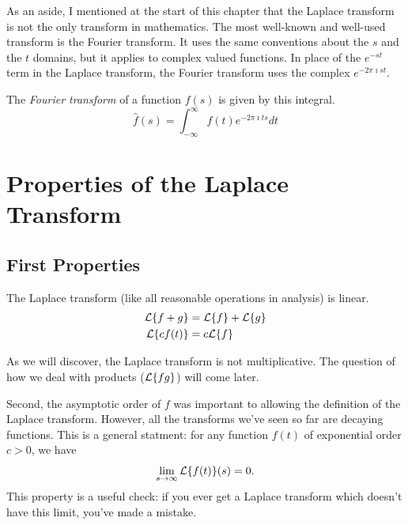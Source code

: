 \documentclass[fleqn,letterpaper]{report}
\begin{document}
As an aside, I mentioned at the start of this chapter that the
Laplace transform is not the only transform in mathematics.
The most well-known and well-used transform is the 
Fourier transform. It uses the same conventions about the $s$
and the $t$ domains, but it applies to complex valued
functions. In place of the $e^{-st}$ term in the Laplace
transform, the Fourier transform uses the complex $e^{-2\pi
\imath st}$. 

\begin{defn}
The \emph{Fourier transform} of a function $f(s)$ is given by
this integral.
\begin{equation*}
\hat{f}(s) = \int_{-\infty}^\infty f(t) e^{-2\pi \imath t s} dt 
\end{equation*}
\end{defn}

\section{Properties of the Laplace Transform}
\label{laplace-transforms-properties}

\subsection{First Properties}
\label{first-properties}

\begin{prop}
The Laplace transform (like all reasonable operations
in analysis) is linear.
\begin{align*}
\mathcal{L} \{ f+ g \} & = \mathcal{L} \{ f \} + \mathcal{L} \{ g \} \\
\mathcal{L} \{ c f(t)\} & = c \mathcal{L} \{ f \} 
\end{align*} 
\end{prop}

As we will discover, the Laplace transform is not
multiplicative. The question of how we deal with products
($\mathcal{L} \{ fg \}$) will come later.

Second, the asymptotic order of $f$ was important to allowing
the definition of the Laplace transform. However, all the
transforms we've seen so far are decaying functions. This is a
general statment: for any function $f(t)$ of exponential order
$c > 0$, we have
\begin{equation*}
\lim_{s \rightarrow \infty} \mathcal{L} \{ f(t) \} (s) = 0.
\end{equation*}
This property is a useful check: if you ever get a Laplace
transform which doesn't have this limit, you've made a
mistake.
\end{document}

